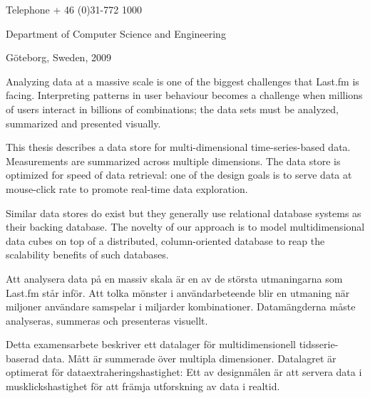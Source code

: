 \noindent Telephone + 46 (0)31-772 1000


\vfill


\noindent Department of Computer Science and Engineering

\noindent G{\"o}teborg, Sweden, 2009

\pagebreak


\vspace{12pt}


\noindent Analyzing data at a massive scale is one of the biggest challenges
that Last.fm is facing. Interpreting patterns in user behaviour becomes a
challenge when millions of users interact in billions of combinations; the data
sets must be analyzed, summarized and presented visually.

This thesis describes a data store for multi-dimensional time-series-based data.
Measurements are summarized across multiple dimensions. The data store is
optimized for speed of data retrieval: one of the design goals is to serve data
at mouse-click rate to promote real-time data exploration.

Similar data stores do exist but they generally use relational database systems
as their backing database. The novelty of our approach is to model
multidimensional data cubes on top of a distributed, column-oriented database to
reap the scalability benefits of such databases.

\vspace{48pt}

\vspace{12pt}


\noindent Att analysera data p{\aa} en massiv skala {\"a}r en av de st{\"o}rsta
utmaningarna som Last.fm st{\aa}r inf{\"o}r. Att tolka m{\"o}nster i
anv{\"a}ndarbeteende blir en utmaning n{\"a}r miljoner anv{\"a}ndare samspelar i
miljarder kombinationer. Datam{\"a}ngderna m{\aa}ste analyseras, summeras och
presenteras visuellt.

Detta examensarbete beskriver ett datalager f{\"o}r multidimensionell
tidsserie-baserad data. M{\aa}tt {\"a}r summerade {\"o}ver multipla dimensioner.
Datalagret {\"a}r optimerat f{\"o}r dataextraheringshastighet: Ett av
designm{\aa}len {\"a}r att servera data i musklickshastighet f{\"o}r att
fr{\"a}mja utforskning av data i realtid.

